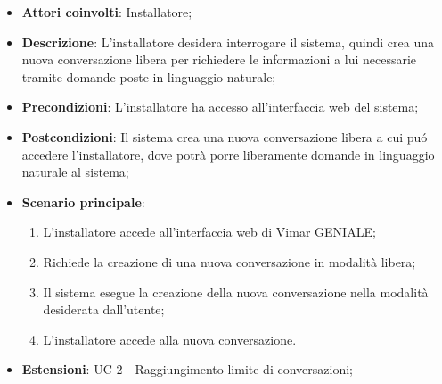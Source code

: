 \begin{itemize}
    \item \textbf{Attori coinvolti}: Installatore;
    \item \textbf{Descrizione}: L’installatore desidera interrogare il sistema, quindi crea una nuova conversazione libera per richiedere le informazioni a lui necessarie tramite domande poste in linguaggio naturale;
    \item \textbf{Precondizioni}: L’installatore ha accesso all’interfaccia web del sistema;
    \item \textbf{Postcondizioni}: Il sistema crea una nuova conversazione libera a cui puó accedere l’installatore, dove potrà porre liberamente domande in linguaggio naturale al sistema;
    \item \textbf{Scenario principale}:
    \begin{enumerate}
    \item L’installatore accede all’interfaccia web di Vimar GENIALE;
    \item Richiede la creazione di una nuova conversazione in modalità libera;
    \item Il sistema esegue la creazione della nuova conversazione nella modalità desiderata dall’utente;
    \item  L’installatore accede alla nuova conversazione.
    \end{enumerate}
    \item \textbf{Estensioni}: UC 2 - Raggiungimento limite di conversazioni;
\end{itemize}

